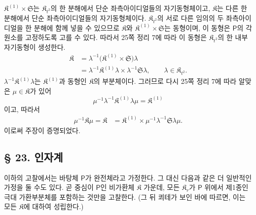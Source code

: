 \(\mathfrak K^{(1)}\times\mathfrak S\)는 \(\mathfrak K_{t^2}\)의 한 분해에서 단순 좌측아이디얼들의 자기동형체이고, \(\mathfrak K\)는 다른 한 분해에서 단순 좌측아이디얼들의 자기동형체이다. \(\mathfrak K_{t^2}\)의 서로 다른 임의의 두 좌측아이디얼을 한 분해에 함께 넣을 수 있으므로 \(\mathfrak K\)와 \(\mathfrak K^{(1)}\times\mathfrak S\)는 동형이며, 이 동형은 \(\mathsf P\)의 각 원소를 고정하도록 고를 수 있다. 따라서 25쪽 정리 7에 따라 이 동형은 \(\mathfrak K_{t^2}\)의 한 내부자기동형이 생성한다.
\[
\begin{aligned}
\mathfrak K
&=\lambda^{-1}
  \bigl(\mathfrak K^{(1)}\times\mathfrak S\bigr)\lambda\\
&=\lambda^{-1}\mathfrak K^{(1)}\lambda
  \times\lambda^{-1}\mathfrak S\lambda,
\qquad
\lambda\in\mathfrak K_{t^2}.
\end{aligned}
\]
\(\lambda^{-1}\mathfrak K^{(1)}\lambda\)는 \(\mathfrak K^{(1)}\)과 동형인 \(\mathfrak K\)의 부분체이다. 그러므로 다시 25쪽 정리 7에 따라 알맞은 \(\mu\in\mathfrak K\)가 있어
\[
        \mu^{-1}\lambda^{-1}
        \mathfrak K^{(1)}\lambda\mu
        =\mathfrak K^{(1)}
\]
이고, 따라서
\[
\begin{aligned}
\mu^{-1}\mathfrak K\mu
=\mathfrak K
&=\mathfrak K^{(1)}
  \times\mu^{-1}\lambda^{-1}
  \mathfrak S\lambda\mu.
\end{aligned}
\]
이로써 주장이 증명되었다.

\subsection*{§ 23. 인자계}

이하의 고찰에서는 바탕체 \(\mathsf P\)가 완전체라고 가정한다. 그 대신 다음과 같은 더 일반적인 가정을 둘 수도 있다. 곧 중심이 \(\mathsf P\)인 비가환체 \(\mathfrak K\) 가운데, 모든 \(\mathfrak K_r\)가 \(\mathsf P\) 위에서 제1종인 극대 가환부분체를 포함하는 것만을 고찰한다. (그 뒤 쾨테가 보인 바에 따르면, 이는 모든 \(\mathfrak K\)에 대하여 성립한다.)

